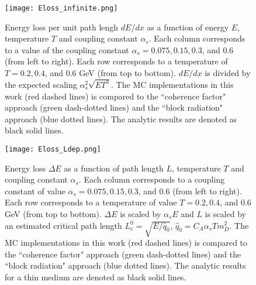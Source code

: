 \begin{figure}
\centering
\texttt{[image: Eloss\_infinite.png]}
\caption{Energy loss per unit path lengh $dE/dx$ as a function of energy $E$, temperature $T$ and coupling constant $\alpha_s$. Each column corresponds to a value of the coupling constant $\alpha_s = 0.075, 0.15, 0.3$, and $0.6$ (from left to right). Each row corresponds to a temperature of $T = 0.2, 0.4$, and $0.6$ GeV (from top to bottom). $dE/dx$ is divided by the expected scaling $\alpha_s^2 \sqrt{ET^3}$. The MC implementations in this work (red dashed lines) is compared to the ``coherence factor" approach (green dash-dotted lines) and the ``block radiation" approach (blue dotted lines). The analytic results are denoted as black solid lines.}
\label{fig:eloss-inf}
\end{figure}

\begin{figure}
\centering
\texttt{[image: Eloss\_Ldep.png]}
\caption{Energy loss $\Delta E$ as a function of path length $L$, temperature $T$ and coupling constant $\alpha_s$. Each column corresponds to a coupling constant of value $\alpha_s = 0.075, 0.15, 0.3$, and $0.6$ (from left to right). Each row corresponds to a temperature of value $T = 0.2, 0.4$, and $0.6$ GeV (from top to bottom). $\Delta E$ is scaled by $\alpha_s E$ and $L$ is scaled by an estimated critical path length $L_c^0 = \sqrt{E/\hat{q}_0}$, $\hat{q}_0 = C_A \alpha_s T m_D^2$. The MC implementations in this work (red dashed lines) is compared to the ``coherence factor" approach (green dash-dotted lines) and the ``block radiation" approach (blue dotted lines). The analytic results for a thin medium are denoted as black solid lines.}
\label{fig:eloss-ldep}
\end{figure}

